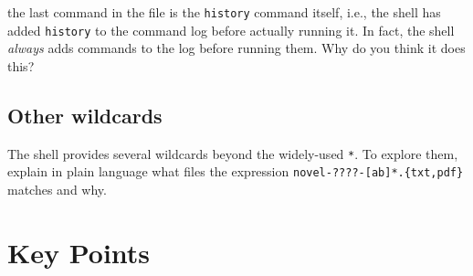 \documentclass[
]{krantz}
\begin{document}
the last command in the file is the \texttt{history} command itself, i.e.,
the shell has added \texttt{history} to the command log before actually
running it. In fact, the shell \emph{always} adds commands to the log
before running them. Why do you think it does this?

\hypertarget{bash-basics-ex-other-wildcards}{%
\subsection{Other wildcards}\label{bash-basics-ex-other-wildcards}}

The shell provides several wildcards beyond the widely-used \texttt{*}.
To explore them,
explain in plain language what files the expression \texttt{novel-????-{[}ab{]}*.\{txt,pdf\}} matches and why.

\hypertarget{bash-basics-keypoints}{%
\section{Key Points}\label{bash-basics-keypoints}}
\end{document}
